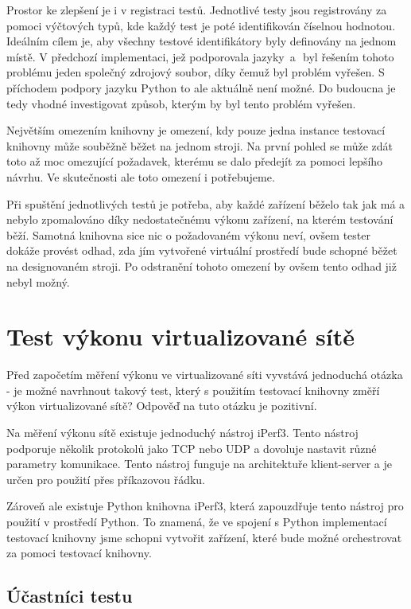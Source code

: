 Prostor ke zlepšení je i v registraci testů. Jednotlivé testy jsou registrovány za pomoci výčtových typů, kde každý test je poté identifikován číselnou hodnotou. Ideálním cílem je, aby všechny testové identifikátory byly definovány na jednom místě. V předchozí implementaci, jež podporovala jazyky \csharp\,a\,\cpp\, byl řešením tohoto problému jeden společný zdrojový soubor, díky čemuž byl problém vyřešen. S příchodem podpory jazyku Python to ale aktuálně není možné. Do budoucna je tedy vhodné investigovat způsob, kterým by byl tento problém vyřešen.

Největším omezením knihovny je omezení, kdy pouze jedna instance testovací knihovny může souběžně běžet na jednom stroji. Na první pohled se může zdát toto až moc omezující požadavek, kterému se dalo předejít za pomoci lepšího návrhu. Ve skutečnosti ale toto omezení i potřebujeme. 

Při spuštění jednotlivých testů je potřeba, aby každé zařízení běželo tak jak má a nebylo zpomalováno díky nedostatečnému výkonu zařízení, na kterém testování běží. Samotná knihovna sice nic o požadovaném výkonu neví, ovšem tester dokáže provést odhad, zda jím vytvořené virtuální prostředí bude schopné běžet na designovaném stroji. Po odstranění tohoto omezení by ovšem tento odhad již nebyl možný.


\section{Test výkonu virtualizované sítě}\label{sec:perfomance_test}

Před započetím měření výkonu ve virtualizované síti vyvstává jednoduchá otázka - je možné navrhnout takový test, který s použitím testovací knihovny změří výkon virtualizované sítě? Odpověď na tuto otázku je pozitivní. 

Na měření výkonu sítě existuje jednoduchý nástroj iPerf3. Tento nástroj podporuje několik protokolů jako TCP nebo UDP a dovoluje nastavit různé parametry komunikace. Tento nástroj funguje na architektuře klient-server a je určen pro použití přes příkazovou řádku.

Zároveň ale existuje Python knihovna iPerf3, která zapouzdřuje tento nástroj pro použití v prostředí Python. To znamená, že ve spojení s Python implementací testovací knihovny jsme schopni vytvořit zařízení, které bude možné orchestrovat za pomoci testovací knihovny.

\subsection{Účastníci testu}

